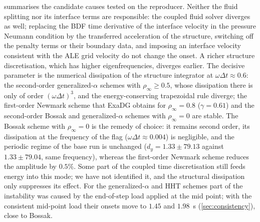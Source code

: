 \documentclass[11pt,a4paper]{article}
\theoremstyle{definition}
\theoremstyle{remark}
\begin{document}
 summarises the candidate causes tested on the reproducer. Neither the fluid
splitting nor its interface terms are responsible: the coupled fluid solver diverges as well;
replacing the BDF time derivative of the interface velocity in the pressure Neumann condition by
the transferred acceleration of the structure, switching off the penalty terms or their boundary
data, and imposing an interface velocity consistent with the ALE grid velocity do not change the
onset. A richer structure discretisation, which has higher eigenfrequencies, diverges earlier. The
decisive parameter is the numerical dissipation of the structure integrator at
$\omega\Delta t\approx0.6$: the second-order generalized-$\alpha$ schemes with $\rho_\infty\ge0.5$,
whose dissipation there is only of order $(\omega\Delta t)^3$, and the energy-conserving
trapezoidal rule diverge; the first-order Newmark scheme that ExaDG obtains for $\rho_\infty=0.8$
($\gamma=0.61$) and the second-order Bossak and generalized-$\alpha$ schemes with $\rho_\infty=0$
are stable. The Bossak scheme with $\rho_\infty=0$ is the remedy of choice: it remains second
order, its dissipation at the frequency of the flag ($\omega\Delta t\approx0.004$) is negligible,
and the periodic regime of the base run is unchanged ($d_y=1.33\pm79.13$ against $1.33\pm79.04$,
same frequency), whereas the first-order Newmark scheme reduces the amplitude by $0.5\%$. Some
part of the coupled time discretisation still feeds energy into this mode; we have not identified
it, and the structural dissipation only suppresses its effect. For the generalized-$\alpha$ and HHT
schemes part of the instability was caused by the end-of-step load applied at the mid point; with
the consistent mid-point load their onsets move to $1.45$ and $1.98$~s (\cref{sec:consistency}),
close to Bossak.
\end{document}
